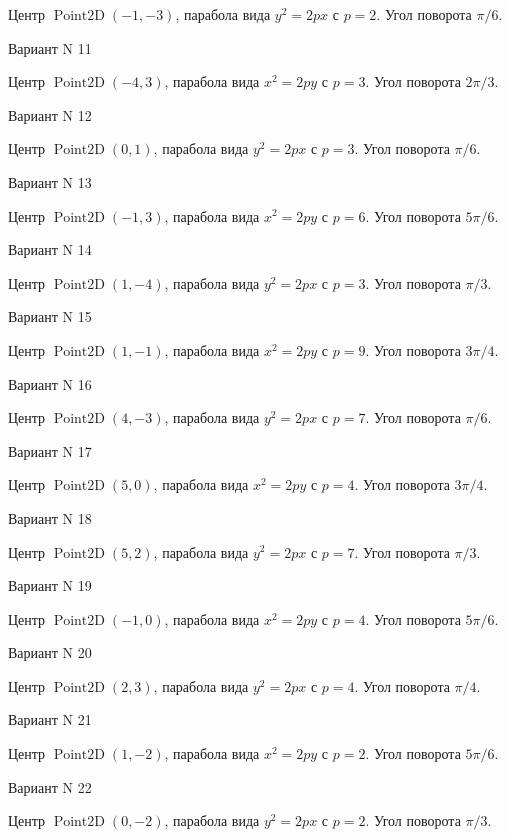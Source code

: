 \documentclass[11pt]{report}
\begin{document}
Центр $\operatorname{Point2D}\left(-1, -3\right)$, парабола вида $y^{2} = 2px$ с $p = 2$. Угол поворота $\pi / 6$.

Вариант N 11

Центр $\operatorname{Point2D}\left(-4, 3\right)$, парабола вида $x^{2} = 2py$ с $p = 3$. Угол поворота $2 \pi / 3$.

Вариант N 12

Центр $\operatorname{Point2D}\left(0, 1\right)$, парабола вида $y^{2} = 2px$ с $p = 3$. Угол поворота $\pi / 6$.

Вариант N 13

Центр $\operatorname{Point2D}\left(-1, 3\right)$, парабола вида $x^{2} = 2py$ с $p = 6$. Угол поворота $5 \pi / 6$.

Вариант N 14

Центр $\operatorname{Point2D}\left(1, -4\right)$, парабола вида $y^{2} = 2px$ с $p = 3$. Угол поворота $\pi / 3$.

Вариант N 15

Центр $\operatorname{Point2D}\left(1, -1\right)$, парабола вида $x^{2} = 2py$ с $p = 9$. Угол поворота $3 \pi / 4$.

Вариант N 16

Центр $\operatorname{Point2D}\left(4, -3\right)$, парабола вида $y^{2} = 2px$ с $p = 7$. Угол поворота $\pi / 6$.

Вариант N 17

Центр $\operatorname{Point2D}\left(5, 0\right)$, парабола вида $x^{2} = 2py$ с $p = 4$. Угол поворота $3 \pi / 4$.

Вариант N 18

Центр $\operatorname{Point2D}\left(5, 2\right)$, парабола вида $y^{2} = 2px$ с $p = 7$. Угол поворота $\pi / 3$.

Вариант N 19

Центр $\operatorname{Point2D}\left(-1, 0\right)$, парабола вида $x^{2} = 2py$ с $p = 4$. Угол поворота $5 \pi / 6$.

Вариант N 20

Центр $\operatorname{Point2D}\left(2, 3\right)$, парабола вида $y^{2} = 2px$ с $p = 4$. Угол поворота $\pi / 4$.

Вариант N 21

Центр $\operatorname{Point2D}\left(1, -2\right)$, парабола вида $x^{2} = 2py$ с $p = 2$. Угол поворота $5 \pi / 6$.

Вариант N 22

Центр $\operatorname{Point2D}\left(0, -2\right)$, парабола вида $y^{2} = 2px$ с $p = 2$. Угол поворота $\pi / 3$.
\end{document}
